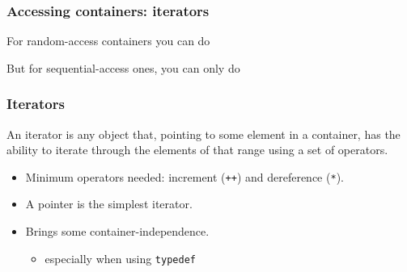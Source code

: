\subsubsection{Accessing containers:
iterators}\label{accessing-containers-iterators}

For random-access containers you can do

\begin{Shaded}
\begin{Highlighting}[]

\NormalTok{,}\NormalTok{,}\NormalTok{,}\NormalTok{\};}
 \NormalTok{(} 
\NormalTok{\}}
\end{Highlighting}
\end{Shaded}

But for sequential-access ones, you can only do

\begin{Shaded}
\begin{Highlighting}[]


\NormalTok{,}\NormalTok{,}\NormalTok{,}\NormalTok{\};}
 
\NormalTok{\}}
\end{Highlighting}
\end{Shaded}

\subsubsection{Iterators}\label{iterators}

An iterator is any object that, pointing to some element in a container,
has the ability to iterate through the elements of that range using a
set of operators.

\begin{itemize}
\itemsep1pt\parskip0pt
\item
  Minimum operators needed: increment (\texttt{++}) and dereference
  (\texttt{*}).
\item
  A pointer is the simplest iterator.
\item
  Brings some container-independence.

  \begin{itemize}
  \itemsep1pt\parskip0pt
  \item
    especially when using \texttt{typedef}
  \end{itemize}
\end{itemize}

